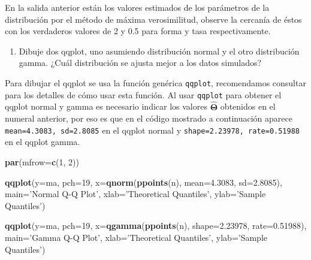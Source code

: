 \documentclass[10pt,]{krantz}
\makeatletter
\newenvironment{Shaded}{\begin{snugshade}}{\end{snugshade}}
\newcommand{\KeywordTok}[1]{\textcolor[rgb]{0.13,0.29,0.53}{\textbf{#1}}}
\newcommand{\DataTypeTok}[1]{\textcolor[rgb]{0.13,0.29,0.53}{#1}}
\newcommand{\DecValTok}[1]{\textcolor[rgb]{0.00,0.00,0.81}{#1}}
\newcommand{\FloatTok}[1]{\textcolor[rgb]{0.00,0.00,0.81}{#1}}
\newcommand{\StringTok}[1]{\textcolor[rgb]{0.31,0.60,0.02}{#1}}
\newcommand{\NormalTok}[1]{#1}
\providecommand{\tightlist}{%
  \setlength{\itemsep}{0pt}\setlength{\parskip}{0pt}}
\newenvironment{kframe}{%
\medskip{}
\setlength{\fboxsep}{.8em}
 \def\at@end@of@kframe{}%
 \ifinner\ifhmode%
  \def\at@end@of@kframe{\end{minipage}}%
  \begin{minipage}{\columnwidth}%
 \fi\fi%
 \def\FrameCommand##1{\hskip\@totalleftmargin \hskip-\fboxsep
 \colorbox{shadecolor}{##1}\hskip-\fboxsep
     \hskip-\linewidth \hskip-\@totalleftmargin \hskip\columnwidth}%
 \MakeFramed {\advance\hsize-\width
   \@totalleftmargin\z@ \linewidth\hsize
   \@setminipage}}%
 {\par\unskip\endMakeFramed%
 \at@end@of@kframe}
\renewenvironment{Shaded}{\begin{kframe}}{\end{kframe}}
\makeatother
\begin{document}
En la salida anterior están los valores estimados de los parámetros de
la distribución por el método de máxima verosimilitud, observe la
cercanía de éstos con los verdaderos valores de 2 y 0.5 para forma y
tasa respectivamente.

\begin{enumerate}
\def\labelenumi{\arabic{enumi})}
\setcounter{enumi}{2}
\tightlist
\item
  Dibuje dos qqplot, uno asumiendo distribución normal y el otro
  distribución gamma. ¿Cuál distribución se ajusta mejor a los datos
  simulados?
\end{enumerate}

Para dibujar el qqplot se usa la función genérica \texttt{qqplot},
recomendamos consultar \citet{hernandez_correa} para los detalles de
cómo usar esta función. Al usar \texttt{qqplot} para obtener el qqplot
normal y gamma es necesario indicar los valores
\(\hat{\boldsymbol{\Theta}}\) obtenidos en el numeral anterior, por eso
es que en el código mostrado a continuación aparece
\texttt{mean=4.3083,\ sd=2.8085} en el qqplot normal y
\texttt{shape=2.23978,\ rate=0.51988} en el qqplot gamma.

\begin{Shaded}
\begin{Highlighting}[]
\KeywordTok{par}\NormalTok{(}\DataTypeTok{mfrow=}\KeywordTok{c}\NormalTok{(}\DecValTok{1}\NormalTok{, }\DecValTok{2}\NormalTok{))}

\KeywordTok{qqplot}\NormalTok{(}\DataTypeTok{y=}\NormalTok{ma, }\DataTypeTok{pch=}\DecValTok{19}\NormalTok{,}
       \DataTypeTok{x=}\KeywordTok{qnorm}\NormalTok{(}\KeywordTok{ppoints}\NormalTok{(n), }\DataTypeTok{mean=}\FloatTok{4.3083}\NormalTok{, }\DataTypeTok{sd=}\FloatTok{2.8085}\NormalTok{),}
       \DataTypeTok{main=}\StringTok{'Normal Q-Q Plot'}\NormalTok{,}
       \DataTypeTok{xlab=}\StringTok{'Theoretical Quantiles'}\NormalTok{,}
       \DataTypeTok{ylab=}\StringTok{'Sample Quantiles'}\NormalTok{)}

\KeywordTok{qqplot}\NormalTok{(}\DataTypeTok{y=}\NormalTok{ma, }\DataTypeTok{pch=}\DecValTok{19}\NormalTok{,}
       \DataTypeTok{x=}\KeywordTok{qgamma}\NormalTok{(}\KeywordTok{ppoints}\NormalTok{(n), }\DataTypeTok{shape=}\FloatTok{2.23978}\NormalTok{, }\DataTypeTok{rate=}\FloatTok{0.51988}\NormalTok{),}
       \DataTypeTok{main=}\StringTok{'Gamma Q-Q Plot'}\NormalTok{,}
       \DataTypeTok{xlab=}\StringTok{'Theoretical Quantiles'}\NormalTok{,}
       \DataTypeTok{ylab=}\StringTok{'Sample Quantiles'}\NormalTok{)}
\end{Highlighting}
\end{Shaded}
\end{document}
